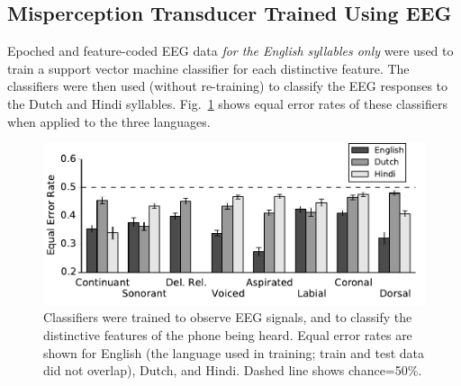 \subsection{Misperception Transducer Trained Using EEG}
\label{ssec:eeg}

\newcommand{\specialcell}[2][c]{%
  \begin{tabular}[#1]{@{}c@{}}#2\end{tabular}}

Epoched and feature-coded EEG data {\em for the English syllables only}
were used to train a support vector machine classifier for each distinctive feature.
The classifiers were then used (without re-training) to classify the
EEG responses to the Dutch and Hindi syllables.
Fig.~\ref{fig:eeg_svm_eers} shows equal error rates of these
classifiers when applied to the three languages.

\begin{figure}
  \centerline{\includegraphics[width=\columnwidth]{../figs/eer-barplot/eer-barplot.pdf}}
  \vspace*{-0.3cm}
  \caption{Classifiers were trained to observe EEG signals, and to
    classify the distinctive features of the phone being heard.  Equal
    error rates are shown for English (the language used in training;
    train and test data did not overlap), Dutch, and Hindi.  Dashed
    line shows chance=50\%.}
  \label{fig:eeg_svm_eers}
\end{figure}

